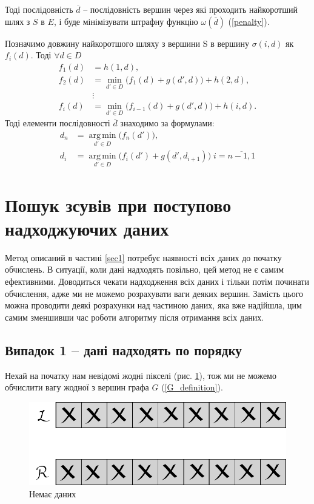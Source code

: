 \documentclass{ConfFTI}
\DeclareMathOperator*{\argmin}{arg\,min}
\begin{document}
Тоді послідовність $\overline{d}$ -- послідовність вершин через які проходить найкоротший шлях з $S$ в $E$, і буде мінімізувати штрафну функцію $ \omega(\overline{d}) $ (\ref{penalty}).

Позначимо довжину найкоротшого шляху з вершини S в вершину $ \sigma(i, d) $ як $ f_i (d) $. Тоді $ \forall d \in D $ 
\begin{align*}
f_1 (d) &= h(1, d), \\
f_2 (d) &=  \min\limits_{d' \in D}\Big( f_1(d) + g(d', d) \Big) + h(2, d), \\
&\vdots \\
f_i (d) &= \min\limits_{d' \in D}\Big( f_{i-1}(d) + g(d', d) \Big) + h(i, d).
\end{align*}
Тоді елементи послідовності $\overline{d}$ знаходимо за формулами:
\begin{align*}
d_n &= \argmin\limits_{d' \in D}{\big( f_n(d') \big)}, \\
d_i &= \argmin\limits_{d' \in D}{\big( f_{i}(d') + g(d',d_{i+1})\big) \; i = \overline{n-1, 1}}
\end{align*}
\section{Пошук зсувів при поступово надходжуючих даних}

Метод описаний в частині \ref{sec1} потребує наявності всіх даних до початку обчислень. В ситуації, коли дані надходять повільно, цей метод не є самим ефективними. Доводиться чекати надходження всіх даних і тільки потім починати обчислення, адже ми не можемо розрахувати ваги деяких вершин.
Замість цього можна проводити деякі розрахунки над частиною даних, яка вже надійшла, цим самим зменшивши час роботи алгоритму після отримання всіх даних.

\subsection{Випадок 1 -- дані надходять по порядку} \label{2.1}

Нехай на початку нам невідомі жодні пікселі (рис. \ref{2.1nodata}), тож ми не можемо обчислити вагу жодної з вершин графа $G$ (\ref{G_definition}).  
\begin{figure}[h!]
	\centering
	\includegraphics[scale = 0.5]{allclosed2.pdf}
	\caption{Немає даних}
	\label{2.1nodata}
\end{figure}
\end{document}
